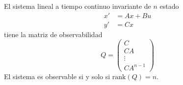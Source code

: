 \begin{teo}
El sistema lineal a tiempo continuo invariante de \(n\) estado 
\[
\begin{aligned}
x' &= Ax + Bu \\
y' &= Cx
\end{aligned}
\]
tiene la matriz de observabilidad 
\[
Q = \begin{pmatrix}
C \\
CA \\
\vdots \\
CA^{n-1}
\end{pmatrix}
\]
El sistema es observable si y solo si \(\text{rank}(Q) = n\).\\
\end{teo}
